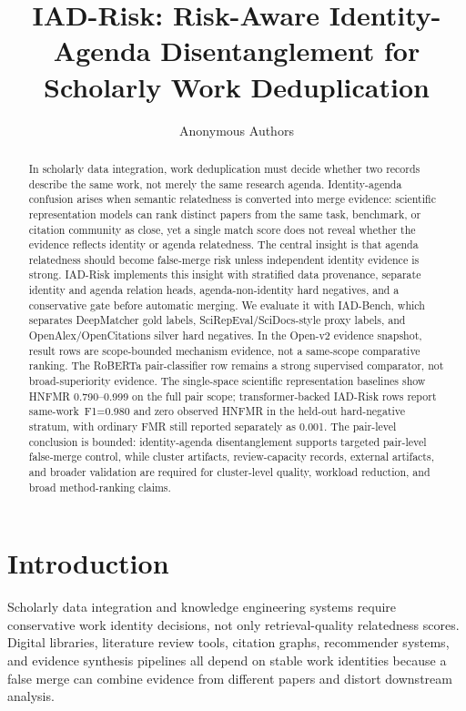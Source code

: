\documentclass[11pt]{article}
\title{IAD-Risk: Risk-Aware Identity-Agenda Disentanglement for Scholarly Work Deduplication}
\author{Anonymous Authors}
\date{}
\begin{document}
\maketitle

\begin{abstract}
In scholarly data integration, work deduplication must decide whether two records describe the same work, not merely the same research agenda. Identity-agenda confusion arises when semantic relatedness is converted into merge evidence: scientific representation models can rank distinct papers from the same task, benchmark, or citation community as close, yet a single match score does not reveal whether the evidence reflects identity or agenda relatedness. The central insight is that agenda relatedness should become false-merge risk unless independent identity evidence is strong. IAD-Risk implements this insight with stratified data provenance, separate identity and agenda relation heads, agenda-non-identity hard negatives, and a conservative gate before automatic merging. We evaluate it with IAD-Bench, which separates DeepMatcher gold labels, SciRepEval/SciDocs-style proxy labels, and OpenAlex/OpenCitations silver hard negatives. In the Open-v2 evidence snapshot, result rows are scope-bounded mechanism evidence, not a same-scope comparative ranking. The RoBERTa pair-classifier row remains a strong supervised comparator, not broad-superiority evidence. The single-space scientific representation baselines show HNFMR 0.790--0.999 on the full pair scope; transformer-backed IAD-Risk rows report \mbox{same-work F1=0.980} and zero observed HNFMR in the held-out hard-negative stratum, with ordinary FMR still reported separately as 0.001. The pair-level conclusion is bounded: identity-agenda disentanglement supports targeted pair-level false-merge control, while cluster artifacts, review-capacity records, external artifacts, and broader validation are required for cluster-level quality, workload reduction, and broad method-ranking claims.
\end{abstract}

\section{Introduction}

Scholarly data integration and knowledge engineering systems require conservative work identity decisions, not only retrieval-quality relatedness scores. Digital libraries, literature review tools, citation graphs, recommender systems, and evidence synthesis pipelines all depend on stable work identities because a false merge can combine evidence from different papers and distort downstream analysis.
\end{document}
